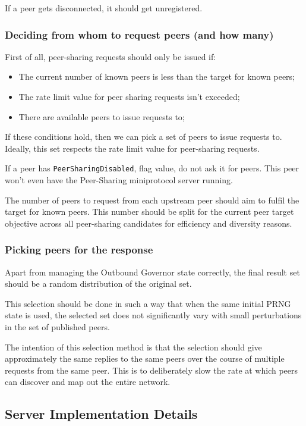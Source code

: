 If a peer gets disconnected, it should get unregistered.

\subsubsection{Deciding from whom to request peers (and how many)}

First of all, peer-sharing requests should only be issued if:

\begin{itemize}
  \item The current number of known peers is less than the target for known peers;
  \item The rate limit value for peer sharing requests isn't exceeded;
  \item There are available peers to issue requests to;
\end{itemize}

If these conditions hold, then we can pick a set of peers to issue requests to.
Ideally, this set respects the rate limit value for peer-sharing requests.

If a peer has \texttt{PeerSharingDisabled}, flag value, do not ask it for peers.
This peer won't even have the Peer-Sharing miniprotocol server running.

The number of peers to request from each upstream peer should aim to fulfil
the target for known peers. This number should be split for the current peer
target objective across all peer-sharing candidates for efficiency and
diversity reasons.

\subsubsection{Picking peers for the response}

Apart from managing the Outbound Governor state correctly, the final result
set should be a random distribution of the original set.

This selection should be done in such a way that when the same initial PRNG
state is used, the selected set does not significantly vary with small
perturbations in the set of published peers.

The intention of this selection method is that the selection should give
approximately the same replies to the same peers over the course of multiple
requests from the same peer. This is to deliberately slow the rate at which
peers can discover and map out the entire network.

\subsection{Server Implementation Details}

